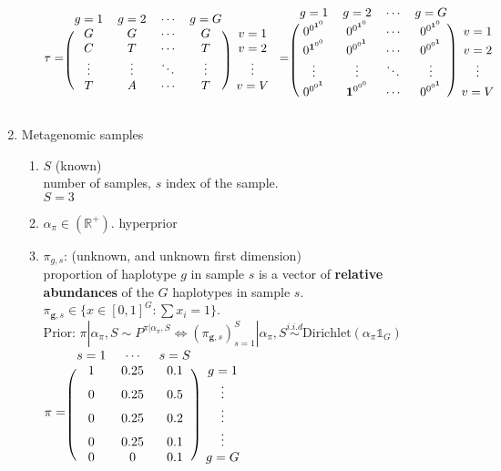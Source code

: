 \documentclass{article}
\newcommand\thevector[4]{
\begin{tikzpicture}
\clip (-0.09,-0.13) rectangle + (.47,.32);
 \node [inner sep=0,outer sep=0,inner frame sep=0pt,tight background,draw=none] (first) at (0,0)  {$#1$};
\node [inner sep=0,outer sep=0,inner frame sep=0pt,tight background,draw=none,scale=.8] (second) at (0.135,0.05) {$#2$};
\node [inner sep=0,outer sep=0,inner frame sep=0pt,tight background,draw=none,scale=.64] (third) at (0.24,0.09) {$#3$};
\node [inner sep=0,outer sep=0,inner frame sep=0pt,tight background,draw=none,scale=.512] (fourth) at (0.33,0.125) {$#4$};  
\end{tikzpicture}
}
\renewcommand\thevector[4]{
{#1}^{{#2}^{{#3}^{#4}}}
}
\newcommand\A{\thevector{\mathbf{1}}{0}{0}{0}}
\newcommand\C{\thevector{0}{\mathbf{1}}{0}{0}}
\newcommand\G{\thevector{0}{0}{\mathbf{1}}{0}}
\newcommand\T{\thevector{0}{0}{0}{\mathbf{1}}}
\newcommand\indexvec[1]{\mathbf{#1}}
\begin{document}
\begin{enumerate}
\begin{enumerate}
{  $$\tau=\begin{blockarray}{ccccc}
    g=1&g=2&\cdots&g=G&\\
    \begin{block}{(cccc)c}
 G&G&\cdots&G&v=1\\   
 C&T&\cdots&T&v=2\\   
 \vdots&\vdots&\ddots&\vdots&\vdots\\   
 T&A&\cdots&T&v=V\\
    \end{block}
\end{blockarray} =    \begin{blockarray}{ccccc}
    g=1&g=2&\cdots&g=G&\\
    \begin{block}{(cccc)c}
 \G&\G&\cdots&\G&v=1\\   
 \C&\T&\cdots&\T&v=2\\   
 \vdots&\vdots&\ddots&\vdots&\vdots\\   
 \T&\A&\cdots&\T&v=V\\
    \end{block}
\end{blockarray} $$}
\end{enumerate}
    \item Metagenomic samples
\begin{enumerate}
    \item $S$ (known)\\
    number of samples, $s$ index of the sample. \\
    {\color{blue}$S=3$}
 \item $\alpha_\pi\in\left(\mathbb{R}^+\right)$. hyperprior
   
    \item $\pi_{g,s}$: (unknown, and unknown first dimension)\\
    proportion of haplotype $g$ in sample $s$ is a vector of {\bf relative abundances} of the $G$ haplotypes in sample $s$.\\
$\pi_{\indexvec{g},s}\in\{x\in[0,1]^G:\sum x_i=1\}$. \\
Prior: $\pi|
    \alpha_\pi,S\sim P^{\pi|\alpha_\pi,S}\Leftrightarrow (\pi_{\indexvec{g},s})_{s=1}^S|
    \alpha_\pi,S\overset{i.i.d}{\sim}\mathrm{Dirichlet}(\alpha_\pi\mathds{1}_G) $\\
    {\color{blue}
$\pi=\begin{blockarray}{cccc}
    s=1&\cdots&s=S&\\
    \begin{block}{(ccc)c}
    1&0.25&0.1&g=1\\
    0&0.25&0.5&\vdots\\
    0&0.25&0.2&\vdots\\
    0&0.25&0.1&\vdots\\
    0&0&0.1&g=G\\
    \end{block}
\end{blockarray}$}
    

\end{enumerate}
\end{enumerate}
\end{document}
